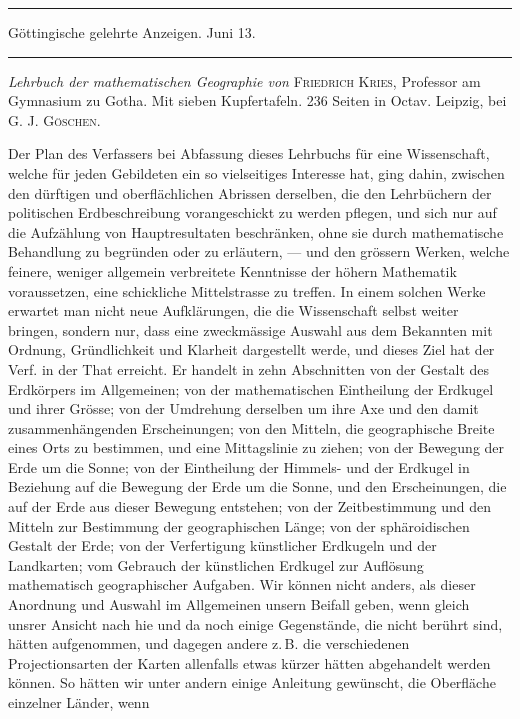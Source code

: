 \par
{}%
\begin{center}
\rule{.85\textwidth}{.3pt}\par
Göttingische gelehrte Anzeigen. Juni 13.\par
\rule{.85\textwidth}{.3pt}
\end{center}
\hspace*{\parindent}\textit{Lehrbuch der mathematischen Geographie von} \textsc{Friedrich Kries}, Professor am Gymnasium zu Gotha. Mit sieben Kupfertafeln. 236 Seiten in Octav. Leipzig, bei \textsc{G. J. Göschen}.

Der Plan des Verfassers bei Abfassung dieses Lehrbuchs für eine Wissenschaft, welche für jeden Gebildeten ein so vielseitiges Interesse hat, ging dahin, zwischen den dürftigen und oberflächlichen Abrissen derselben, die den Lehrbüchern der politischen Erdbeschreibung vorangeschickt zu werden pflegen, und sich nur auf die Aufzählung von Hauptresultaten beschränken, ohne sie durch mathematische Behandlung zu begründen oder zu erläutern, --- und den grössern Werken, welche feinere, weniger allgemein verbreitete Kenntnisse der höhern Mathematik voraussetzen, eine schickliche Mittelstrasse zu treffen. In einem solchen Werke erwartet man nicht neue Aufklärungen, die die Wissenschaft selbst weiter bringen, sondern nur, dass eine zweckmässige Auswahl aus dem Bekannten mit Ordnung, Gründlichkeit und Klarheit dargestellt werde, und dieses Ziel hat der Verf. in der That erreicht. Er handelt in zehn Abschnitten von der Gestalt des Erdkörpers im Allgemeinen; von der mathematischen Eintheilung der Erdkugel und ihrer Grösse; von der Umdrehung derselben um ihre Axe und den damit zusammenhängenden Erscheinungen; von den Mitteln, die geographische Breite eines Orts zu bestimmen, und eine Mittagslinie zu ziehen; von der Bewegung der Erde um die Sonne; von der Eintheilung der Himmels- und der Erdkugel in Beziehung auf die Bewegung der Erde um die Sonne, und den Erscheinungen, die auf der Erde aus dieser Bewegung entstehen; von der Zeitbestimmung und den Mitteln zur Bestimmung der geographischen Länge; von der sphäroidischen Gestalt der Erde; von der Verfertigung künstlicher Erdkugeln und der Landkarten; vom Gebrauch der künstlichen Erdkugel zur Auflösung mathematisch geographischer Aufgaben. Wir können nicht anders, als dieser Anordnung und Auswahl im Allgemeinen unsern Beifall geben, wenn gleich unsrer Ansicht nach hie und da noch einige Gegenstände, die nicht berührt sind, hätten aufgenommen, und dagegen andere z.\,B. die verschiedenen Projectionsarten der Karten allenfalls etwas kürzer hätten abgehandelt werden können. So hätten wir unter andern einige Anleitung gewünscht, die Oberfläche einzelner Länder, wenn

